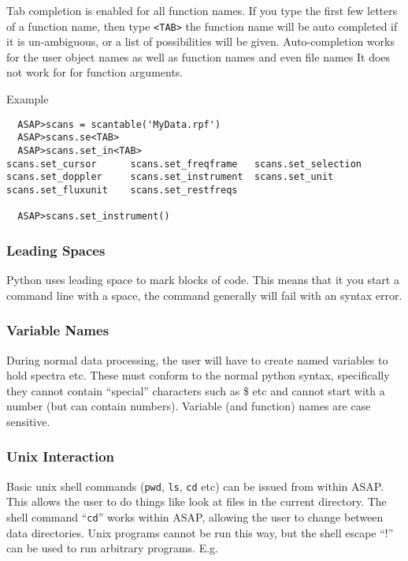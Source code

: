 \documentclass[11pt]{article}
\newcommand{\cmd}[1]{{\tt #1}}
\begin{document}
Tab completion is enabled for all
function names. If you type the first few letters of a function name,
then type {\tt <TAB>} the function name will be auto completed if it
is un-ambiguous, or a list of possibilities will be
given. Auto-completion works for the user object names as well as
function names and even file names It does not work for for function
arguments.

Example
\begin{verbatim}
  ASAP>scans = scantable('MyData.rpf')
  ASAP>scans.se<TAB>
  ASAP>scans.set_in<TAB>
scans.set_cursor      scans.set_freqframe   scans.set_selection
scans.set_doppler     scans.set_instrument  scans.set_unit
scans.set_fluxunit    scans.set_restfreqs

  ASAP>scans.set_instrument()
\end{verbatim}

\subsubsection{Leading Spaces}

Python uses leading space to mark blocks
of code. This means that it you start a command line with a space, the
command generally will fail with an syntax error.

\subsubsection{Variable Names}

During normal data processing, the user
will have to create named variables to hold spectra etc. These must
conform to the normal python syntax, specifically they cannot contain
``special'' characters such as \@ \$ etc and cannot start with a
number (but can contain numbers).  Variable (and function) names are
case sensitive.

\subsubsection{Unix Interaction}

Basic unix shell commands (\cmd{pwd},
\cmd{ls}, \cmd{cd} etc) can be issued from within ASAP. This allows
the user to do things like look at files in the current directory. The
shell command ``\cmd{cd}'' works within ASAP, allowing the user to
change between data directories. Unix programs cannot be run this way,
but the shell escape ``$!$'' can be used to run arbitrary
programs. E.g.
\end{document}
